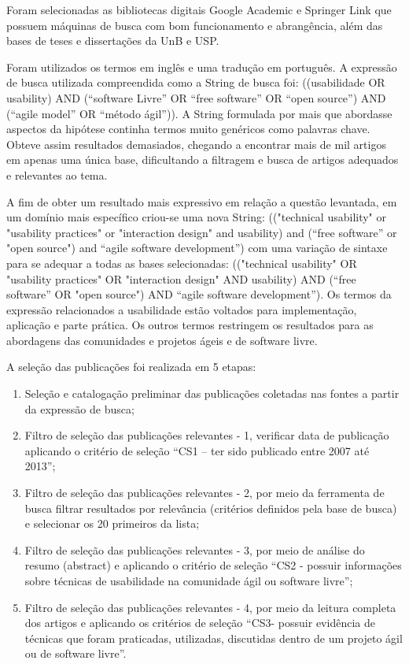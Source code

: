 \documentclass[12pt]{article}
\begin{document}
%
Foram selecionadas as bibliotecas digitais Google Academic e Springer Link que possuem máquinas de busca com bom funcionamento e abrangência, além das bases de teses e dissertações da UnB e USP.

%
Foram utilizados os termos em inglês e uma tradução em português. A expressão de busca utilizada compreendida como a String de busca foi: ((usabilidade OR usability) AND (“software Livre” OR “free software” OR “open source”) AND (“agile model” OR “método ágil”)). A String formulada por mais que abordasse aspectos da hipótese continha termos muito genéricos como palavras chave. Obteve assim resultados demasiados, chegando a encontrar mais de mil artigos em apenas uma única base, dificultando a filtragem e busca de artigos adequados e relevantes ao tema.

%
A fim de obter um resultado mais expressivo em relação a questão levantada, em um domínio mais específico criou-se uma nova String: (("technical usability" or "usability practices" or "interaction design" and usability) and (“free software” or "open source") and “agile software development”) com uma variação de sintaxe para se adequar a todas as bases selecionadas: (("technical usability" OR "usability practices" OR "interaction design" AND usability) AND (“free software” OR "open source") AND “agile software development”). Os termos da expressão relacionados a usabilidade estão voltados para implementação, aplicação e parte prática. Os outros termos restringem os resultados para as abordagens das comunidades e projetos ágeis e de software livre.

%
A seleção das publicações foi realizada em 5 etapas:

\begin{enumerate}
\item Seleção e catalogação preliminar das publicações coletadas nas fontes a partir da expressão de busca;
\item Filtro de seleção das publicações relevantes - 1, verificar data de publicação aplicando o critério de seleção “CS1 – ter sido publicado entre 2007 até 2013”;
\item Filtro de seleção das publicações relevantes - 2, por meio da ferramenta de busca filtrar resultados por relevância (critérios definidos pela base de busca) e selecionar os 20 primeiros da lista;
\item Filtro de seleção das publicações relevantes - 3, por meio de análise do resumo (abstract) e aplicando o critério de seleção “CS2 - possuir informações sobre técnicas de usabilidade na comunidade ágil ou software livre”;
\item Filtro de seleção das publicações relevantes - 4, por meio da leitura completa dos artigos e aplicando os critérios de seleção “CS3- possuir evidência de técnicas que foram praticadas, utilizadas, discutidas dentro de um projeto ágil ou de software livre”.
\end{enumerate}
\end{document}
